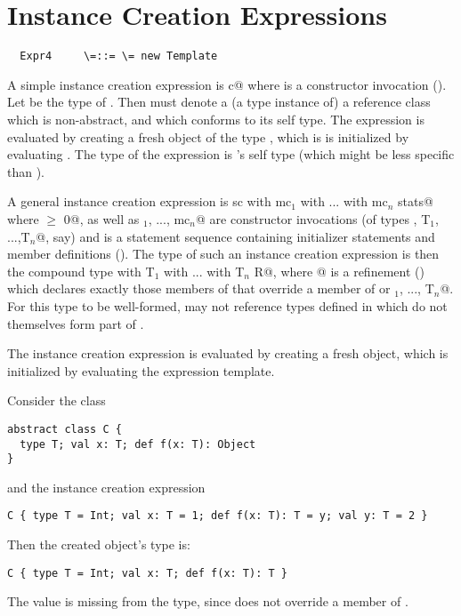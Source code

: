 \documentclass[11pt]{report}
\begin{document}
\section{Instance Creation Expressions}
\label{sec:inst-creation}

\syntax\begin{verbatim}
  Expr4     \=::= \= new Template
\end{verbatim}

A simple instance creation expression is \verb@new c@ where \verb@c@
is a constructor invocation ().  Let \verb@T@
be the type of \verb@c@. Then \verb@T@ must denote a (a type instance
of) a reference class which is non-abstract, and which conforms to its self
type. The expression is evaluated by creating a fresh object of the
type \verb@T@, which is is initialized by evaluating \verb@c@. The
type of the expression is \verb@T@'s self type (which might be less
specific than \verb@T@).

A general instance creation expression is
\verb@new sc with mc$_1$ with ... with mc$_n$ {stats}@ where
\verb@n $\geq$ 0@, \verb@sc@ as well as \verb@mc$_1$, ..., mc$_n$@ are
constructor invocations (of types \verb@S, T$_1$, ...,T$_n$@, say) and
\verb@stats@ is a statement sequence containing initializer statements
and member definitions (). The type of such an
instance creation expression is then the compound type
\verb@S with T$_1$ with ... with T$_n$ {R}@, where @ is a
refinement () which declares exactly those
members of \verb@stats@ that override a member of \verb@S@ or
\verb@T$_1$, ..., T$_n$@. For this type to be well-formed, \verb@R@
may not reference types defined in \verb@stats@ which do not
themselves form part of \verb@R@.

The instance creation expression is evaluated by creating a fresh
object, which is initialized by evaluating the expression template.

\example Consider the class
\begin{verbatim}
abstract class C {
  type T; val x: T; def f(x: T): Object
}
\end{verbatim}
and the instance creation expression
\begin{verbatim}
C { type T = Int; val x: T = 1; def f(x: T): T = y; val y: T = 2 }
\end{verbatim}
Then the created object's type is:
\begin{verbatim}
C { type T = Int; val x: T; def f(x: T): T }
\end{verbatim}
The value \verb@y@ is missing from the type, since \verb@y@ does not
override a member of \verb@C@.
\end{document}
